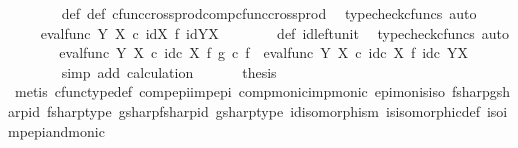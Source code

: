 \begin{isabellebody}
\ \ \ \ \ \ \isamarkupfalse%
\ {\isasymphi}{\isacharunderscore}{\kern0pt}def\ {\isasympsi}{\isacharunderscore}{\kern0pt}def\ cfunc{\isacharunderscore}{\kern0pt}cross{\isacharunderscore}{\kern0pt}prod{\isacharunderscore}{\kern0pt}comp{\isacharunderscore}{\kern0pt}cfunc{\isacharunderscore}{\kern0pt}cross{\isacharunderscore}{\kern0pt}prod\ \isamarkupfalse%
\ {\isacharparenleft}{\kern0pt}typecheck{\isacharunderscore}{\kern0pt}cfuncs{\isacharcomma}{\kern0pt}\ auto{\isacharparenright}{\kern0pt}\isanewline
\ \ \ \ \isamarkupfalse%
\ \isamarkupfalse%
\ {\isachardoublequoteopen}{\isachardot}{\kern0pt}{\isachardot}{\kern0pt}{\isachardot}{\kern0pt}\ {\isacharequal}{\kern0pt}\ eval{\isacharunderscore}{\kern0pt}func\ Y\ X\ {\isasymcirc}\isactrlsub c\ id{\isacharparenleft}{\kern0pt}X{\isacharparenright}{\kern0pt}\ {\isasymtimes}\isactrlsub f\ id{\isacharparenleft}{\kern0pt}Y\isactrlbsup X\isactrlesup {\isacharparenright}{\kern0pt}{\isachardoublequoteclose}\isanewline
\ \ \ \ \ \ \isamarkupfalse%
\ {\isasympsi}{\isacharunderscore}{\kern0pt}def\ id{\isacharunderscore}{\kern0pt}left{\isacharunderscore}{\kern0pt}unit{}\ \isamarkupfalse%
\ {\isacharparenleft}{\kern0pt}typecheck{\isacharunderscore}{\kern0pt}cfuncs{\isacharcomma}{\kern0pt}\ auto{\isacharparenright}{\kern0pt}\isanewline
\ \ \ \ \isamarkupfalse%
\ \isamarkupfalse%
\ {\isachardoublequoteopen}eval{\isacharunderscore}{\kern0pt}func\ Y\ X\ {\isasymcirc}\isactrlsub c\ id\isactrlsub c\ X\ {\isasymtimes}\isactrlsub f\ g\isactrlsup {\isasymsharp}\ {\isasymcirc}\isactrlsub c\ f\isactrlsup {\isasymsharp}\ {\isacharequal}{\kern0pt}\ eval{\isacharunderscore}{\kern0pt}func\ Y\ X\ {\isasymcirc}\isactrlsub c\ id\isactrlsub c\ X\ {\isasymtimes}\isactrlsub f\ id\isactrlsub c\ {\isacharparenleft}{\kern0pt}Y\isactrlbsup X\isactrlesup {\isacharparenright}{\kern0pt}{\isachardoublequoteclose}\isanewline
\ \ \ \ \ \ \isamarkupfalse%
\ {\isacharparenleft}{\kern0pt}simp\ add{\isacharcolon}{\kern0pt}\ calculation{\isacharparenright}{\kern0pt}\isanewline
\ \ \isamarkupfalse%
\isanewline
\ \ \isamarkupfalse%
\ {\isacharquery}{\kern0pt}thesis\isanewline
\ \ \ \ \isamarkupfalse%
\ {\isacharparenleft}{\kern0pt}metis\ cfunc{\isacharunderscore}{\kern0pt}type{\isacharunderscore}{\kern0pt}def\ comp{\isacharunderscore}{\kern0pt}epi{\isacharunderscore}{\kern0pt}imp{\isacharunderscore}{\kern0pt}epi\ comp{\isacharunderscore}{\kern0pt}monic{\isacharunderscore}{\kern0pt}imp{\isacharunderscore}{\kern0pt}monic\ epi{\isacharunderscore}{\kern0pt}mon{\isacharunderscore}{\kern0pt}is{\isacharunderscore}{\kern0pt}iso\ fsharp{\isacharunderscore}{\kern0pt}gsharp{\isacharunderscore}{\kern0pt}id\ fsharp{\isacharunderscore}{\kern0pt}type\ gsharp{\isacharunderscore}{\kern0pt}fsharp{\isacharunderscore}{\kern0pt}id\ gsharp{\isacharunderscore}{\kern0pt}type\ id{\isacharunderscore}{\kern0pt}isomorphism\ is{\isacharunderscore}{\kern0pt}isomorphic{\isacharunderscore}{\kern0pt}def\ iso{\isacharunderscore}{\kern0pt}imp{\isacharunderscore}{\kern0pt}epi{\isacharunderscore}{\kern0pt}and{\isacharunderscore}{\kern0pt}monic{\isacharparenright}{\kern0pt}\isanewline

\end{isabellebody}
